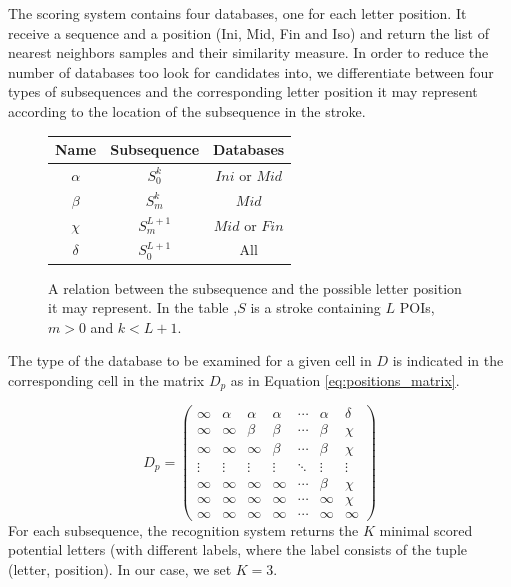 \documentclass[journal,compsoc]{IEEEtran}
\begin{document}
The scoring system contains four databases, one for each letter position. 
It receive a sequence and a position (Ini, Mid, Fin and Iso) and return the list of nearest neighbors samples and their similarity measure.
In order to reduce the number of databases too look for candidates into, we differentiate between four types of subsequences and the corresponding letter position it may represent according to the location of the subsequence in the stroke.\\
\begin{figure}
\centering
\renewcommand{\arraystretch}{2}
\begin{tabular}{| c |c | c |}
\hline
  Name     & Subsequence      & Databases       \\
\hline
  $\alpha$ & $S_0^{k}$         & $Ini$ or $Mid$  \\
\hline
  $\beta$  & $S_{m}^{k}$     & $Mid$              \\
\hline
  $\chi$    & $S_{m}^{L+1}$ & $Mid$ or $Fin$   \\
\hline
  $\delta$ & $S_0^{L+1}$     & All                   \\
\hline
\end{tabular}
\caption{A relation between the subsequence and the possible letter position it may represent. In the table ,$S$ is a stroke containing $L$ POIs, $m>0$ and $k<L+1$.}
\label{table:subsequences_types}
\end{figure}

The type of the database to be examined for a given cell in $D$ is indicated in the corresponding cell in the matrix $D_p$ as in Equation \ref{eq:positions_matrix}. 

\begin{equation}
D_{p}=
\left( 
\begin{array}{ccccccc}
\infty 	& \alpha & \alpha & \alpha  & \cdots & \alpha & \delta \\
\infty  & \infty  & \beta   & \beta   & \cdots  & \beta  & \chi    \\
\infty  & \infty  & \infty   & \beta   & \cdots  & \beta  & \chi    \\
\vdots & \vdots & \vdots  & \vdots & \ddots  & \vdots & \vdots \\
\infty  & \infty  & \infty   & \infty   & \cdots  & \beta  & \chi    \\
\infty  & \infty  & \infty   & \infty   & \cdots  & \infty  & \chi    \\
\infty  & \infty  & \infty   & \infty   & \cdots  & \infty  & \infty \end{array} \right)
\label{eq:positions_matrix}
\end{equation}
For each subsequence, the recognition system returns the $K$ minimal scored potential letters (with different labels, where the label consists of the tuple (letter, position). In our case, we set $K=3$.\\
\end{document}
